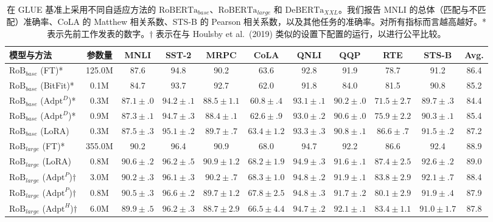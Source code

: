 \documentclass[11pt,UTF8,fontset=fandol]{ctexart}
\begin{document}
\begin{table}[H]\centering
\caption{在 GLUE 基准上采用不同自适应方法的 $\text{RoBERTa}_{base}$、$\text{RoBERTa}_{large}$ 和 $\text{DeBERTa}_{XXL}$。我们报告 MNLI 的总体（匹配与不匹配）准确率、CoLA 的 Matthew 相关系数、STS-B 的 Pearson 相关系数，以及其他任务的准确率。对所有指标而言越高越好。* 表示先前工作发表的数字。$\dagger$ 表示在与 Houlsby et al.\ (2019) 类似的设置下配置的运行，以进行公平比较。}
\label{tab:2}
\setlength{\tabcolsep}{3.2pt}
\small
\begin{tabular}{lcccccccccc}
\toprule
模型与方法 & 参数量 & MNLI & SST-2 & MRPC & CoLA & QNLI & QQP & RTE & STS-B & Avg. \\
\midrule
$\text{RoB}_{base}$ (FT)* & 125.0M & 87.6 & 94.8 & 90.2 & 63.6 & 92.8 & 91.9 & 78.7 & 91.2 & 86.4 \\
$\text{RoB}_{base}$ (BitFit)* & 0.1M & 84.7 & 93.7 & 92.7 & 62.0 & 91.8 & 84.0 & 81.5 & 90.8 & 85.2 \\
$\text{RoB}_{base}$ ($\text{Adpt}^D$)* & 0.3M & $87.1\pm.0$ & $94.2\pm.1$ & $88.5\pm1.1$ & $60.8\pm.4$ & $93.1\pm.1$ & $90.2\pm.0$ & $71.5\pm2.7$ & $89.7\pm.3$ & 84.4 \\
$\text{RoB}_{base}$ ($\text{Adpt}^D$)* & 0.9M & $87.3\pm.1$ & $94.7\pm.3$ & $88.4\pm.1$ & $62.6\pm.9$ & $93.0\pm.2$ & $90.6\pm.0$ & $75.9\pm2.2$ & $90.3\pm.1$ & 85.4 \\
$\text{RoB}_{base}$ (LoRA) & 0.3M & $87.5\pm.3$ & $95.1\pm.2$ & $89.7\pm.7$ & $63.4\pm1.2$ & $93.3\pm.3$ & $90.8\pm.1$ & $86.6\pm.7$ & $91.5\pm.2$ & 87.2 \\
\midrule
$\text{RoB}_{large}$ (FT)* & 355.0M & 90.2 & 96.4 & 90.9 & 68.0 & 94.7 & 92.2 & 86.6 & 92.4 & 88.9 \\
$\text{RoB}_{large}$ (LoRA) & 0.8M & $90.6\pm.2$ & $96.2\pm.5$ & $90.9\pm1.2$ & $68.2\pm1.9$ & $94.9\pm.3$ & $91.6\pm.1$ & $87.4\pm2.5$ & $92.6\pm.2$ & 89.0 \\
$\text{RoB}_{large}$ ($\text{Adpt}^P$)$\dagger$ & 3.0M & $90.2\pm.3$ & $96.1\pm.3$ & $90.2\pm.7$ & $68.3\pm1.0$ & $94.8\pm.2$ & $91.9\pm.1$ & $83.8\pm2.9$ & $92.1\pm.7$ & 88.4 \\
$\text{RoB}_{large}$ ($\text{Adpt}^P$)$\dagger$ & 0.8M & $90.5\pm.3$ & $96.6\pm.2$ & $89.7\pm1.2$ & $67.8\pm2.5$ & $94.8\pm.3$ & $91.7\pm.2$ & $80.1\pm2.9$ & $91.9\pm.4$ & 87.9 \\
$\text{RoB}_{large}$ ($\text{Adpt}^H$)$\dagger$ & 6.0M & $89.9\pm.5$ & $96.2\pm.3$ & $88.7\pm2.9$ & $66.5\pm4.4$ & $94.7\pm.2$ & $92.1\pm.1$ & $83.4\pm1.1$ & $91.0\pm1.7$ & 87.8 \\

\end{tabular}
\end{table}
\end{document}
